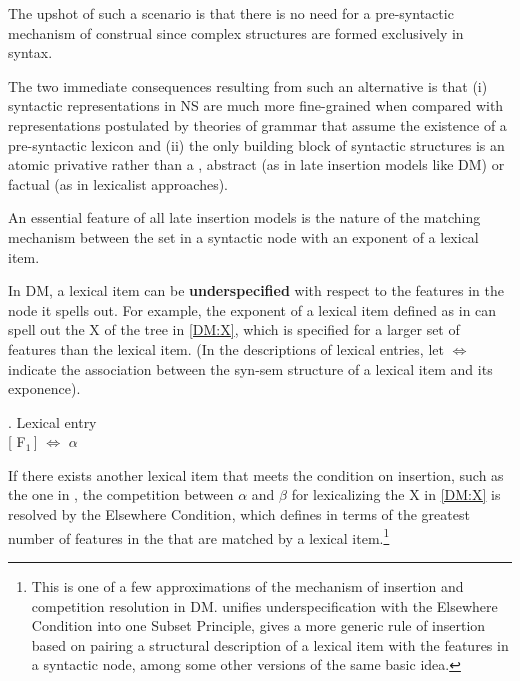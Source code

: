 The upshot of such a scenario is that there is no need for a pre-syntactic mechanism of construal since complex  structures are formed exclusively in syntax. 
\par
The two immediate consequences resulting from such an alternative is that (i) syntactic representations in NS  are much more fine-grained when compared with representations postulated by theories of grammar that assume the existence of a pre-syntactic lexicon and (ii) the only building block of syntactic structures is an atomic privative  rather than a , abstract (as in late insertion models like DM) or factual (as in lexicalist approaches). 
\par
An essential feature of all late insertion models is the nature of the matching mechanism between the  set in a syntactic node with an exponent of a lexical item. 
\par
In DM,  a lexical item can be \textbf{underspecified} with respect to the features in the node it spells out. For example, the exponent of a lexical item defined as in \Next can spell out the  X of the tree in \ref{DM:X}, which is specified for a larger set of features than the lexical item. (In the descriptions of lexical entries, let $\Leftrightarrow$ indicate the association between the syn-sem structure of a lexical item and its exponence).


\ex. Lexical entry\\[0.5ex]
 [ F$_{1}$\,] $\Leftrightarrow$ $\alpha$  

\noindent
If there exists another lexical item that meets the condition on insertion, such as the one in \Next, the competition between $\alpha$ and $\beta$ for lexicalizing the  X in \ref{DM:X} is resolved by the Elsewhere Condition, which \cite{Halle1997} defines in terms of the greatest number of features in the  that are matched by a lexical item.\footnote{This is one of a few approximations of the mechanism of insertion and competition resolution in  DM. \cite{Halle1997} unifies underspecification with the Elsewhere Condition into one Subset Principle, \cite{Bobaljik2017} gives a more generic rule of insertion based on pairing a structural description of a lexical item with the features in a syntactic node, among some other versions of the same basic idea.
}%

